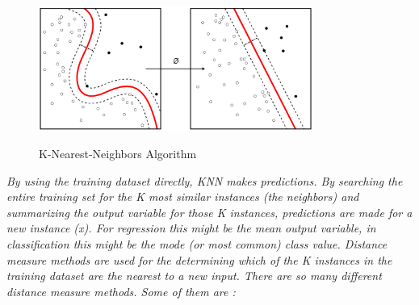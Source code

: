 \begin{figure}[H]
 \centering
  \includegraphics[width=0.8\textwidth]{./Bilder/k-nearest-neighbors.png}\label{Procedures_of_IPM}
  \caption{K-Nearest-Neighbors Algorithm\cite{k_nearest_neighbors_wikipedia}}
\end{figure}

\emph{\color{red}By using the training dataset directly, KNN makes predictions. By searching the entire training set for the K most similar instances (the neighbors) and summarizing the output variable for those K instances, predictions are made for a new instance (x). {For regression this might be the mean output variable, in classification this might be the mode (or most common) class value.} Distance measure methods are used for the determining which of the K instances in the training dataset are the nearest to a new input. There are so many different distance measure methods. Some of them are :}

